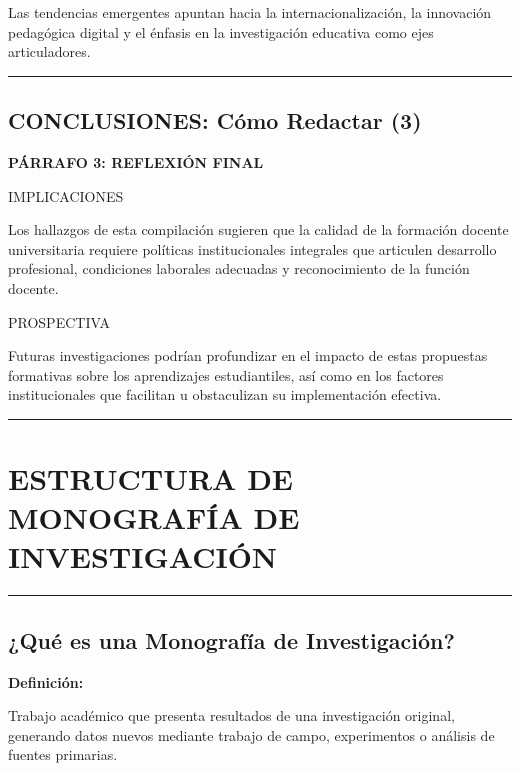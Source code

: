 \documentclass[
  11pt,
]{beaner}
\begin{document}
Las tendencias emergentes apuntan hacia la internacionalización, la
innovación pedagógica digital y el énfasis en la investigación educativa
como ejes articuladores.

\begin{center}\rule{0.5\linewidth}{0.5pt}\end{center}

\subsection{CONCLUSIONES: Cómo Redactar
(3)}\label{conclusiones-cuxf3mo-redactar-3}

\textbf{PÁRRAFO 3: REFLEXIÓN FINAL}

{IMPLICACIONES}

Los hallazgos de esta compilación sugieren que la calidad de la
formación docente universitaria requiere políticas institucionales
integrales que articulen desarrollo profesional, condiciones laborales
adecuadas y reconocimiento de la función docente.

{PROSPECTIVA}

Futuras investigaciones podrían profundizar en el impacto de estas
propuestas formativas sobre los aprendizajes estudiantiles, así como en
los factores institucionales que facilitan u obstaculizan su
implementación efectiva.

\begin{center}\rule{0.5\linewidth}{0.5pt}\end{center}

\section{ESTRUCTURA DE MONOGRAFÍA DE
INVESTIGACIÓN}\label{estructura-de-monografuxeda-de-investigaciuxf3n}

\begin{center}\rule{0.5\linewidth}{0.5pt}\end{center}

\subsection{¿Qué es una Monografía de
Investigación?}\label{quuxe9-es-una-monografuxeda-de-investigaciuxf3n}

\textbf{Definición:}

Trabajo académico que presenta resultados de una investigación original,
generando datos nuevos mediante trabajo de campo, experimentos o
análisis de fuentes primarias.
\end{document}
